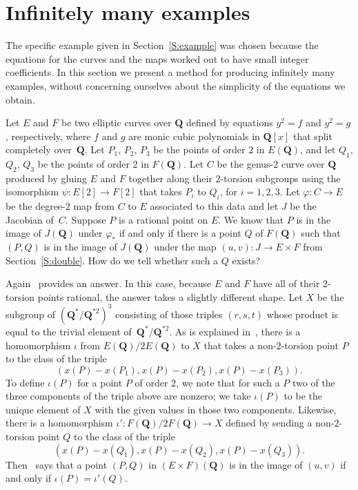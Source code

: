 \documentclass{amsart}
\theoremstyle{remark}
\begin{document}
\section{Infinitely many examples}
\label{S:examples}

The specific example given in Section~\ref{S:example} was chosen because the
equations for the curves and the maps worked out to have small integer 
coefficients.  In this section we present a method for producing infinitely 
many examples, without concerning ourselves about the simplicity of the
equations we obtain.

Let $E$ and $F$ be two elliptic curves over ${{\mathbf{Q}}}$ defined by equations 
$y^2 = f$ and $y^2 = g$, respectively, where $f$ and $g$ are monic cubic
polynomials in ${{\mathbf{Q}}}[x]$ that split completely over~${{\mathbf{Q}}}$. Let $P_1$, $P_2$, 
$P_3$ be the points of order $2$ in $E({{\mathbf{Q}}})$, and let $Q_1$, $Q_2$, $Q_3$ be 
the points of order $2$ in $F({{\mathbf{Q}}})$.  Let $C$ be the genus-$2$ curve over ${{\mathbf{Q}}}$ 
produced by gluing $E$ and $F$ together along their $2$-torsion subgroups using
the isomorphism $\psi\colon E[2]\to F[2]$ that takes $P_i$ to $Q_i$, for 
$i=1,2,3$. Let $\varphi\colon C\to E$ be the degree-$2$ map from $C$ to $E$ 
associated to this data and let $J$ be the Jacobian of~$C$.  Suppose $P$ is a
rational point on $E$.  We know that $P$ is in the image of $J({{\mathbf{Q}}})$ under 
$\varphi_*$ if and only if there is a point $Q$ of $F({{\mathbf{Q}}})$ such that $(P,Q)$ 
is in the image of $J({{\mathbf{Q}}})$ under the map $(u,v)\colon J\to E\times F$ from 
Section~\ref{S:double}. How do we tell whether such a $Q$ exists?

Again~\cite[Proposition~12, p.~338]{HoweLeprevostEtAl2000} provides an answer. 
In this case, because $E$ and $F$ have all of their $2$-torsion points 
rational, the answer takes a slightly different shape. Let $X$ be the subgroup 
of $({{\mathbf{Q}}}^*/{{\mathbf{Q}}}^{*2})^3$ consisting of those triples $(r,s,t)$ whose product is
equal to the trivial element of~${{\mathbf{Q}}}^*/{{\mathbf{Q}}}^{*2}$. As is explained 
in~\cite[\S{}3.7]{HoweLeprevostEtAl2000}, there is a homomorphism $\iota$ from 
$E({{\mathbf{Q}}})/2E({{\mathbf{Q}}})$ to $X$ that takes a non-$2$-torsion point $P$ to the class of 
the triple
\[
(x(P) - x(P_1), x(P) - x(P_2), x(P) - x(P_3)).
\]
To define $\iota(P)$ for a point $P$ of order $2$, we note that for such a $P$ 
two of the three components of the triple above are nonzero; we take $\iota(P)$
to be the unique element of $X$ with the given values in those two components. 
Likewise, there is a homomorphism $\iota'\colon F({{\mathbf{Q}}})/2F({{\mathbf{Q}}})\to X$ defined by
sending a non-$2$-torsion point $Q$ to the class of the triple
\[
(x(P) - x(Q_1), x(P) - x(Q_2), x(P) - x(Q_3)).
\]
Then~\cite[Proposition~12, p.~338]{HoweLeprevostEtAl2000} says that a point 
$(P,Q)$ in $(E\times F)({{\mathbf{Q}}})$ is in the image of $(u,v)$ if and only if
$\iota(P) = \iota'(Q)$.
\end{document}
